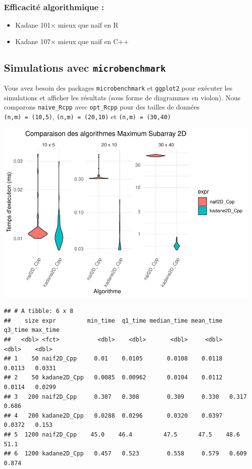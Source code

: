 \documentclass[
]{article}
\begin{document}
\subsubsection{Efficacité algorithmique
:}\label{efficacituxe9-algorithmique}

\begin{itemize}
\item
  Kadane 101× mieux que naïf en R\\
\item
  Kadane 107× mieux que naïf en C++
\end{itemize}

\subsection{\texorpdfstring{Simulations avec
\texttt{microbenchmark}}{Simulations avec microbenchmark}}\label{simulations-avec-microbenchmark}

Vous avez besoin des packages \texttt{microbenchmark} et
\texttt{ggplot2} pour exécuter les simulations et afficher les résultats
(sous forme de diagrammes en violon). Nous comparons
\texttt{naive\_Rcpp} avec \texttt{opt\_Rcpp} pour des tailles de données
\texttt{(n,m)\ =\ (10,5)}, \texttt{(n,m)\ =\ (20,10)} et
\texttt{(n,m)\ =\ (30,40)}

\includegraphics{MaxSubarray2D_files/figure-latex/benchmark-1.pdf}

\begin{verbatim}
## # A tibble: 6 x 8
##    size expr         min_time  q1_time median_time mean_time q3_time max_time
##   <dbl> <fct>           <dbl>    <dbl>       <dbl>     <dbl>   <dbl>    <dbl>
## 1    50 naif2D_Cpp     0.01    0.0105       0.0108    0.0118  0.0113   0.0331
## 2    50 kadane2D_Cpp   0.0085  0.00962      0.0104    0.0112  0.0114   0.0299
## 3   200 naif2D_Cpp     0.307   0.308        0.309     0.330   0.317    0.686 
## 4   200 kadane2D_Cpp   0.0288  0.0296       0.0320    0.0397  0.0372   0.153 
## 5  1200 naif2D_Cpp    45.0    46.4         47.5      47.5    48.6     51.1   
## 6  1200 kadane2D_Cpp   0.457   0.523        0.558     0.579   0.609    0.874
\end{verbatim}
\end{document}
